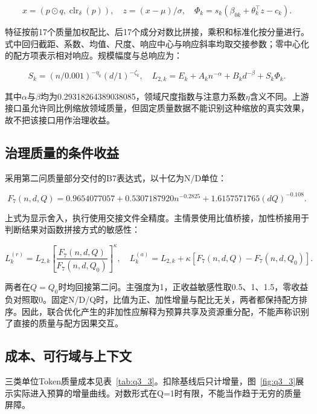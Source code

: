 \documentclass[UTF8,12pt,a4paper]{ctexart}
\begin{document}
\begin{equation}\label{eq:q3_3}
x=(p\odot q,\operatorname{clr}_{\delta}(p)),\quad z=(x-\mu)/\sigma,\quad\Phi_k=s_k(\beta_{0k}+\theta_k^\top z-c_k).
\end{equation}

特征按前17个质量加权配比、后17个成分对数比拼接，乘积和标准化按分量进行。式中回归截距、系数、均值、尺度、响应中心与响应斜率均取交接参数；零中心化的配方项表示相对响应。规模幅度与总响应为：


\begin{equation}\label{eq:q3_4}
S_k=(n/0.001)^{-\eta_k}(d/1)^{-\zeta_k},\quad L_{2,k}=E_k+A_kn^{-\alpha}+B_kd^{-\beta}+S_k\Phi_k.
\end{equation}

其中$\alpha$与$\beta$均为0.29318264389038085，领域尺度指数与注意力系数$\eta$含义不同。上游接口虽允许同比例缩放领域质量，但固定质量数据不能识别这种缩放的真实效果，故不把该接口用作治理收益。


\subsection{治理质量的条件收益}

采用第二问质量部分交付的B7表达式，以十亿为N/D单位：


\begin{equation}\label{eq:q3_5}
F_7(n,d,Q)=0.9654077057+0.5307187920n^{-0.2825}+1.6157571765(dQ)^{-0.108}.
\end{equation}

上式为显示舍入，执行使用交接文件全精度。主情景使用比值桥接，加性桥接用于判断结果对函数拼接方式的敏感性：


\begin{equation}\label{eq:q3_6}
L_k^{(r)}=L_{2,k}\left[\frac{F_7(n,d,Q)}{F_7(n,d,Q_0)}\right]^\kappa,\quad L_k^{(a)}=L_{2,k}+\kappa[F_7(n,d,Q)-F_7(n,d,Q_0)].
\end{equation}

两者在$Q=Q_0$时均回接第二问。主强度为1，正收益敏感性取0.5、1、1.5，零收益负对照取0。固定N/D/Q时，比值为正、加性增量与配比无关，两者都保持配方排序。因此，联合优化产生的非加性应解释为预算共享及资源重分配，不能声称识别了直接的质量与配方因果交互。


\subsection{成本、可行域与上下文}

三类单位Token质量成本见表~\ref{tab:q3_3}。扣除基线后只计增量，图~\ref{fig:q3_3}展示实际进入预算的增量曲线。对数形式在Q=1时有限，不能当作趋于无穷的质量屏障。
\end{document}

